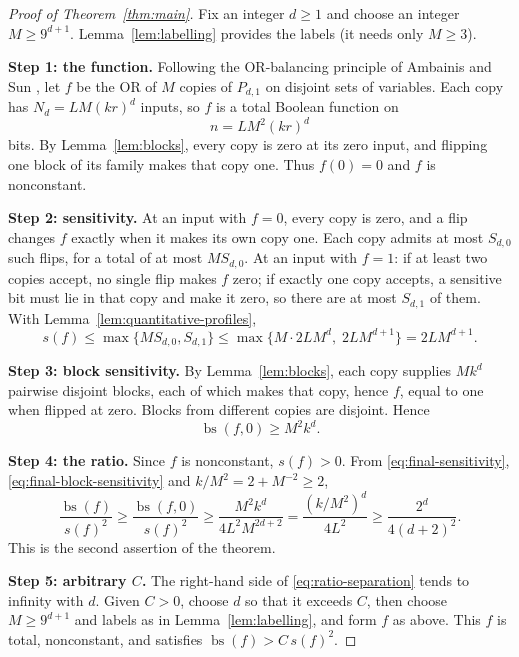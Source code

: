 \documentclass[11pt]{article}
\newcommand{\bs}{\operatorname{bs}}
\theoremstyle{definition}
\theoremstyle{remark}
\begin{document}
\begin{proof}[Proof of Theorem~\ref{thm:main}]
Fix an integer \(d\ge1\) and choose an integer \(M\ge9^{d+1}\).
Lemma~\ref{lem:labelling} provides the labels (it needs only \(M\ge3\)).

\medskip\noindent\textbf{Step 1: the function.}
Following the OR-balancing principle of Ambainis and Sun
\cite[Section~4, Lemma~1]{AmbainisSun2011}, let \(f\) be the OR of \(M\)
copies of \(P_{d,1}\) on disjoint sets of variables. Each copy has
\(N_d=LM(kr)^d\) inputs, so \(f\) is a total Boolean function on
\begin{equation}
\label{eq:final-dimension}
 n=LM^2(kr)^d
\end{equation}
bits. By Lemma~\ref{lem:blocks}, every copy is zero at its zero input, and
flipping one block of its family makes that copy one. Thus \(f(0)=0\) and
\(f\) is nonconstant.

\medskip\noindent\textbf{Step 2: sensitivity.}
At an input with \(f=0\), every copy is zero, and a flip changes \(f\) exactly
when it makes its own copy one. Each copy admits at most \(S_{d,0}\) such
flips, for a total of at most \(MS_{d,0}\).
At an input with \(f=1\): if at least two copies accept, no single flip makes
\(f\) zero; if exactly one copy accepts, a sensitive bit must lie in that copy
and make it zero, so there are at most \(S_{d,1}\) of them.
With Lemma~\ref{lem:quantitative-profiles},
\begin{equation}
\label{eq:final-sensitivity}
 s(f)\leq\max\{M S_{d,0},S_{d,1}\}
       \leq\max\{M\cdot2LM^d,\;2LM^{d+1}\}=2L M^{d+1}.
\end{equation}

\noindent\textbf{Step 3: block sensitivity.}
By Lemma~\ref{lem:blocks}, each copy supplies \(Mk^d\) pairwise disjoint
blocks, each of which makes that copy, hence \(f\), equal to one when flipped
at zero. Blocks from different copies are disjoint. Hence
\begin{equation}
\label{eq:final-block-sensitivity}
 \bs(f,0)\geq M^2k^d.
\end{equation}

\noindent\textbf{Step 4: the ratio.}
Since \(f\) is nonconstant, \(s(f)>0\). From \eqref{eq:final-sensitivity},
\eqref{eq:final-block-sensitivity} and \(k/M^2=2+M^{-2}\ge2\),
\begin{equation}
\label{eq:ratio-separation}
 \frac{\bs(f)}{s(f)^2}
 \geq\frac{\bs(f,0)}{s(f)^2}
 \geq\frac{M^2k^d}{4L^2M^{2d+2}}
 =\frac{(k/M^2)^d}{4L^2}
 \geq\frac{2^d}{4(d+2)^2}.
\end{equation}
This is the second assertion of the theorem.

\medskip\noindent\textbf{Step 5: arbitrary \(C\).}
The right-hand side of \eqref{eq:ratio-separation} tends to infinity with
\(d\). Given \(C>0\), choose \(d\) so that it exceeds \(C\), then choose
\(M\ge9^{d+1}\) and labels as in Lemma~\ref{lem:labelling}, and form \(f\) as
above. This \(f\) is total, nonconstant, and satisfies
\(\bs(f)>C\,s(f)^2\).
\end{proof}
\end{document}
